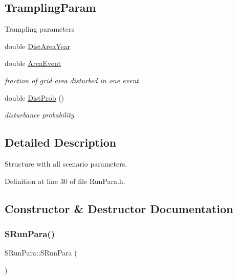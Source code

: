 \subsection*{Trampling\+Param}
\label{_amgrp008167ccfacd060642d340399e086a5c}%
Trampling parameters \begin{DoxyCompactItemize}
\item 
double \mbox{\hyperlink{struct_s_run_para_ade224470f81d526ed1959c826ba4664c}{Dist\+Area\+Year}}
\item 
\mbox{\label{struct_s_run_para_a8113a5ac131494ba3af5bfccf804df2d}} 
double \mbox{\hyperlink{struct_s_run_para_a8113a5ac131494ba3af5bfccf804df2d}{Area\+Event}}
\begin{DoxyCompactList}\small\item\em fraction of grid area disturbed in one event \end{DoxyCompactList}\item 
\mbox{\label{struct_s_run_para_a244bdc3b72c2435d7f7b479abd6ad9bf}} 
double \mbox{\hyperlink{struct_s_run_para_a244bdc3b72c2435d7f7b479abd6ad9bf}{Dist\+Prob}} ()
\begin{DoxyCompactList}\small\item\em disturbance probability \end{DoxyCompactList}\end{DoxyCompactItemize}


\subsection{Detailed Description}
Structure with all scenario parameters. 

Definition at line 30 of file Run\+Para.\+h.



\subsection{Constructor \& Destructor Documentation}
\mbox{\label{struct_s_run_para_a98ac754a6dfdc060af1d68b45501b40f}} 
\subsubsection{\texorpdfstring{SRunPara()}{SRunPara()}}
{\footnotesize\ttfamily S\+Run\+Para\+::\+S\+Run\+Para (\begin{DoxyParamCaption}{ }\end{DoxyParamCaption})}




